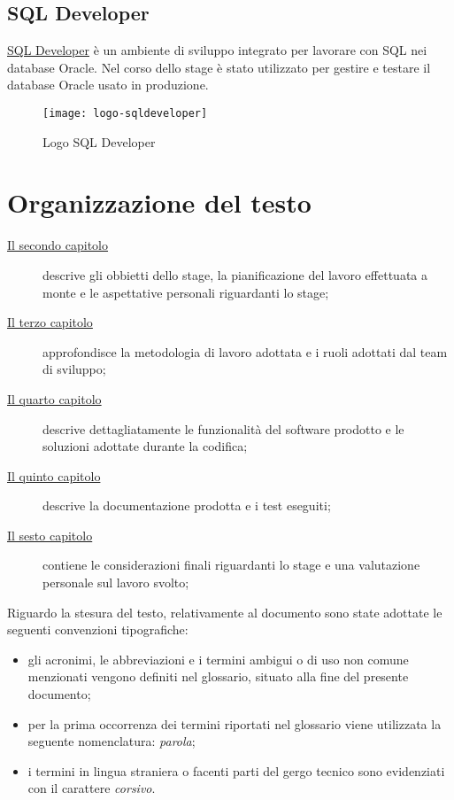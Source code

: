 \subsection{SQL Developer}
\href{https://www.oracle.com/database/technologies/appdev/sqldeveloper-landing.html}{SQL Developer} è un ambiente di sviluppo integrato per lavorare con SQL nei database Oracle. Nel corso dello stage è stato utilizzato per gestire e testare il database Oracle usato in produzione.
\begin{figure}[h]
    \begin{center}
    \texttt{[image: logo-sqldeveloper]}
    \caption{Logo SQL Developer}
    \label{fig:figure13}
    \end{center}
\end{figure}

\section{Organizzazione del testo}

\begin{description}
    \item[{\hyperref[cap:obbiettivi-pianificazione]{Il secondo capitolo}}] descrive gli obbietti dello stage, la pianificazione del lavoro effettuata a monte e le aspettative personali riguardanti lo stage;
    
    \item[{\hyperref[cap:metodologia-lavoro]{Il terzo capitolo}}] approfondisce la metodologia di lavoro adottata e i ruoli adottati dal team di sviluppo;
    
    \item[{\hyperref[cap:prodotto-sw]{Il quarto capitolo}}] descrive dettagliatamente le funzionalità del software prodotto e le soluzioni adottate durante la codifica;
    
    \item[{\hyperref[cap:docs-test]{Il quinto capitolo}}] descrive la documentazione prodotta e i test eseguiti;
    
    \item[{\hyperref[cap:considerazioni]{Il sesto capitolo}}] contiene le considerazioni finali riguardanti lo stage e una valutazione personale sul lavoro svolto;

\end{description}

Riguardo la stesura del testo, relativamente al documento sono state adottate le seguenti convenzioni tipografiche:
\begin{itemize}
	\item gli acronimi, le abbreviazioni e i termini ambigui o di uso non comune menzionati vengono definiti nel glossario, situato alla fine del presente documento;
	\item per la prima occorrenza dei termini riportati nel glossario viene utilizzata la seguente nomenclatura: \emph{parola}\glsfirstoccur{};
	\item i termini in lingua straniera o facenti parti del gergo tecnico sono evidenziati con il carattere \emph{corsivo}.
\end{itemize}